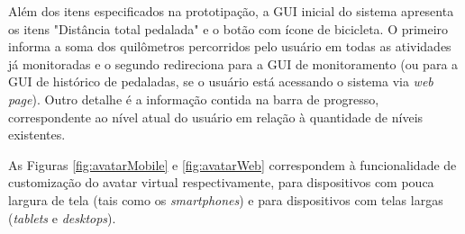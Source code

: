Além dos itens especificados na prototipação, a GUI inicial do sistema apresenta os itens "Distância total pedalada" e o botão com ícone de bicicleta. O primeiro informa a soma dos quilômetros percorridos pelo usuário em todas as atividades já monitoradas e o segundo redireciona para a GUI de monitoramento (ou para a GUI de histórico de pedaladas, se o usuário está acessando o sistema via \textit{web page}). Outro detalhe é a informação contida na barra de progresso, correspondente ao nível atual do usuário em relação à quantidade de níveis existentes. 
\par
As Figuras \ref{fig:avatarMobile} e \ref{fig:avatarWeb} correspondem à funcionalidade de customização do avatar virtual respectivamente, para dispositivos com pouca largura de tela (tais como os \textit{smartphones}) e para dispositivos com telas largas (\textit{tablets} e \textit{desktops}).   

